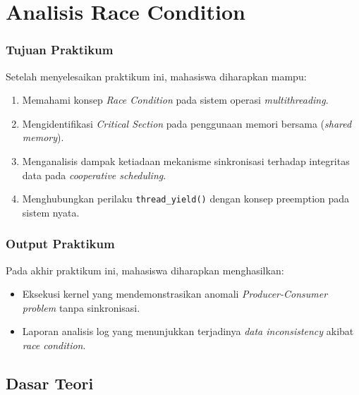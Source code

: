 
\chapter{Analisis Race Condition}
\label{chap:modul-09}

\subsection{Tujuan Praktikum}
Setelah menyelesaikan praktikum ini, mahasiswa diharapkan mampu:
\begin{enumerate}
    \item Memahami konsep \textit{Race Condition} pada sistem operasi \textit{multithreading}.
    \item Mengidentifikasi \textit{Critical Section} pada penggunaan memori bersama (\textit{shared memory}).
    \item Menganalisis dampak ketiadaan mekanisme sinkronisasi terhadap integritas data pada \textit{cooperative scheduling}.
    \item Menghubungkan perilaku \texttt{thread\_yield()} dengan konsep preemption pada sistem nyata.
\end{enumerate}
 
\subsection{Output Praktikum}
Pada akhir praktikum ini, mahasiswa diharapkan menghasilkan:
\begin{itemize}
    \item Eksekusi kernel yang mendemonstrasikan anomali \textit{Producer-Consumer problem} tanpa sinkronisasi.
    \item Laporan analisis log yang menunjukkan terjadinya \textit{data inconsistency} akibat \textit{race condition}.
\end{itemize}


\newpage
\section{Dasar Teori}

